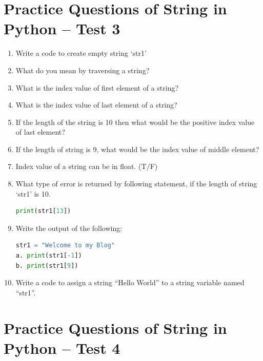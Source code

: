 \documentclass[12pt,a4paper]{article}
\begin{document}
\section{Practice Questions of String in Python -- Test 3}

\begin{enumerate}[label=\textbf{Q\arabic*.}]

\item Write a code to create empty string `str1'

\item What do you mean by traversing a string?

\item What is the index value of first element of a string?

\item What is the index value of last element of a string?

\item If the length of the string is 10 then what would be the positive index value of last element?

\item If the length of string is 9, what would be the index value of middle element?

\item Index value of a string can be in float. (T/F)

\item What type of error is returned by following statement, if the length of string `str1' is 10.
\begin{lstlisting}[language=Python]
print(str1[13])
\end{lstlisting}

\item Write the output of the following:
\begin{lstlisting}[language=Python]
str1 = "Welcome to my Blog"
a. print(str1[-1])
b. print(str1[9])
\end{lstlisting}

\item Write a code to assign a string ``Hello World'' to a string variable named ``str1''.

\end{enumerate}

\section{Practice Questions of String in Python -- Test 4}
\end{document}
